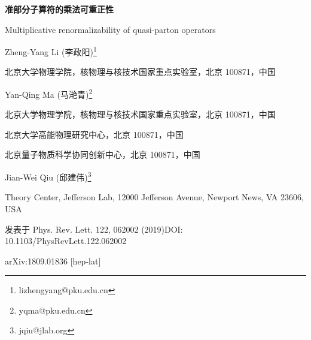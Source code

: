 \documentclass[11pt]{ctexart}
\begin{document}
\begin{center}
  {\LARGE\bfseries 准部分子算符的乘法可重正性\par}
  \vspace{0.4em}
  {\large Multiplicative renormalizability of quasi-parton operators\par}
  \vspace{1.2em}
  {\large Zheng-Yang Li (李政阳)\footnote{lizhengyang@pku.edu.cn}\par}
  \vspace{0.2em}
  {\normalsize 北京大学物理学院，核物理与核技术国家重点实验室，北京 100871，中国\par}
  \vspace{0.8em}
  {\large Yan-Qing Ma (马滟青)\footnote{yqma@pku.edu.cn}\par}
  \vspace{0.2em}
  {\normalsize 北京大学物理学院，核物理与核技术国家重点实验室，北京 100871，中国\par}
  {\normalsize 北京大学高能物理研究中心，北京 100871，中国\par}
  {\normalsize 北京量子物质科学协同创新中心，北京 100871，中国\par}
  \vspace{0.8em}
  {\large Jian-Wei Qiu (邱建伟)\footnote{jqiu@jlab.org}\par}
  \vspace{0.2em}
  {\normalsize Theory Center, Jefferson Lab, 12000 Jefferson Avenue, Newport News, VA 23606, USA\par}
  \vspace{1.2em}
  {\small 发表于 Phys. Rev. Lett. 122, 062002 (2019)\quad DOI: 10.1103/PhysRevLett.122.062002\par}
  {\small arXiv:1809.01836 [hep-lat]\par}
\end{center}

\vspace{1em}









\end{document}
